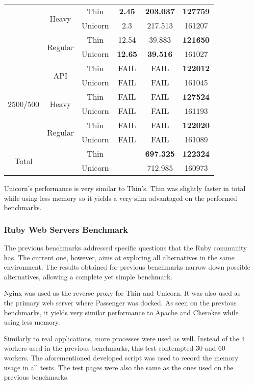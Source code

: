 \begin{table}[h!t]
\begin{tabular}{c|c|c|c|c|c}
     & \multirow{2}{*}{Heavy} & Thin & \textbf{2.45} & \textbf{203.037} & \textbf{127759}\\\cline{3-6}
     &  & Unicorn & 2.3 & 217.513 & 161207\\\cline{2-6}
     & \multirow{2}{*}{Regular} & Thin & 12.54 & 39.883 & \textbf{121650}\\\cline{3-6}
     &  & Unicorn & \textbf{12.65} & \textbf{39.516} & 161027\\\hline
    \multirow{6}{*}{2500/500} & \multirow{2}{*}{API} & Thin & FAIL & FAIL & \textbf{122012}\\\cline{3-6}
     &  & Unicorn & FAIL & FAIL & 161045\\\cline{2-6}
     & \multirow{2}{*}{Heavy} & Thin & FAIL & FAIL & \textbf{127524}\\\cline{3-6}
     &  & Unicorn & FAIL & FAIL & 161193\\\cline{2-6}
     & \multirow{2}{*}{Regular} & Thin & FAIL & FAIL & \textbf{122020}\\\cline{3-6}
     &  & Unicorn & FAIL & FAIL & 161089\\\hline
    \multirow{2}{*}{Total} &  & Thin &  & \textbf{697.325} & \textbf{122324}\\\cline{2-6}
     &  & Unicorn &  & 712.985 & 160973\\
  \end{tabular}
\end{table}

Unicorn's performance is very similar to Thin's. Thin was slightly faster in total while using less memory so it yields a very slim advantaged on the performed benchmarks.

\subsubsection{Ruby Web Servers Benchmark}
The previous benchmarks addressed specific questions that the Ruby community has. The current one, however, aims at exploring all alternatives in the same environment. The results obtained for previous benchmarks narrow down possible alternatives, allowing a complete yet simple benchmark. 

Nginx was used as the reverse proxy for Thin and Unicorn. It was also used as the primary web server where Passenger was docked. As seen on the previous benchmarks, it yields very similar performance to Apache and Cherokee while using less memory.

Similarly to real applications, more processes were used as well. Instead of the 4 workers used in the previous benchmarks, this test contempted 30 and 60 workers. The aforementioned developed script was used to record the memory usage in all tests. The test pages were also the same as the ones used on the previous benchmarks.


